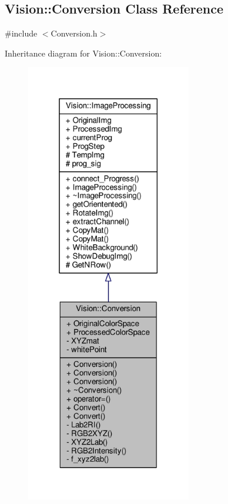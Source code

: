 \hypertarget{class_vision_1_1_conversion}{}\subsection{Vision\+:\+:Conversion Class Reference}
\label{class_vision_1_1_conversion}


{\ttfamily \#include $<$Conversion.\+h$>$}



Inheritance diagram for Vision\+:\+:Conversion\+:
\nopagebreak
\begin{figure}[H]
\begin{center}
\leavevmode
\includegraphics[height=550pt]{class_vision_1_1_conversion__inherit__graph}
\end{center}
\end{figure}


